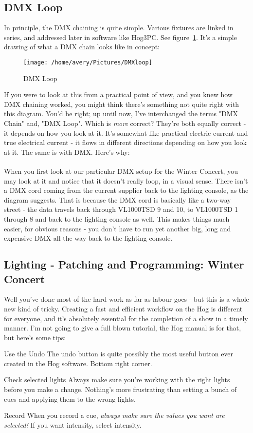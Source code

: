 \documentclass[11pt,a4paper]{book}
\begin{document}
\begin{enumerate}
\subsection{DMX Loop}
In principle, the DMX chaining is quite simple. Various fixtures are linked in series, and addressed later in software like Hog3PC. See figure~\ref{DMXloop}. It's a simple drawing of what a DMX chain looks like in concept:
\begin{figure}[h]
\label{DMXloop}
\texttt{[image: /home/avery/Pictures/DMXloop]} 
\caption{DMX Loop}
\end{figure}
If you were to look at this from a practical point of view, and you knew how DMX chaining worked, you might think there's something not quite right with this diagram. You'd be right; up until now, I've interchanged the terms "DMX Chain" and, "DMX Loop". Which is \textit{more} correct? They're both equally correct - it depends on how you look at it. It's somewhat like practical electric current and true electrical current - it flows in different directions depending on how you look at it. The same is with DMX. Here's why:
\\
\\
When you first look at our particular DMX setup for the Winter Concert, you may look at it and notice that it doesn't really loop, in a visual sense. There isn't a DMX cord coming from the current supplier back to the lighting console, as the diagram suggests. That is because the DMX cord is basically like a two-way street - the data travels back through VL1000TSD 9 and 10, to VL1000TSD 1 through 8 and back to the lighting console as well. This makes things much easier, for obvious reasons - you don't have to run yet another big, long and expensive DMX all the way back to the lighting console.  

\subsection{Lighting - Patching and Programming: Winter Concert}
Well you've done most of the hard work as far as labour goes - but this is a whole new kind of tricky. Creating a fast and efficient workflow on the Hog is different for everyone, and it's absolutely essential for the completion of a show in a timely manner. I'm not going to give a full blown tutorial, the Hog manual is for that, but here's some tips:
\\
\begin{compactdesc}
\item[Use the Undo] The undo button is quite possibly the most useful button ever created in the Hog software. Bottom right corner.
\item[Check selected lights] Always make sure you're working with the right lights before you make a change. Nothing's more frustrating than setting a bunch of cues and applying them to the wrong lights.
\item[Record] When you record a cue, \textit{always make sure the values you want are selected!} If you want intensity, select intensity.\\
\end{compactdesc}


\end{enumerate}
\end{document}
